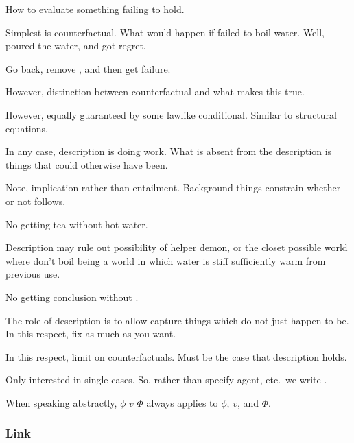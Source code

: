 \begin{note}
  How to evaluate something failing to hold.

  Simplest is counterfactual.
  What would happen if failed to boil water.
  Well, poured the water, and got regret.

  Go back, remove \ros{}, and then get failure.

  However, distinction between counterfactual and what makes this true.

  However, equally guaranteed by some lawlike conditional.
  Similar to structural equations.

  In any case, description is doing work.
  What is absent from the description is things that could otherwise have been.

  Note, implication rather than entailment.
  Background things constrain whether or not follows.

  No getting tea without hot water.

  Description may rule out possibility of helper demon, or the closet possible world where don't boil being a world in which water is stiff sufficiently warm from previous use.

  No getting conclusion without \ros{}.
\end{note}

\begin{note}
  The role of description is to allow capture things which do not just happen to be.
  In this respect, fix as much as you want.

  In this respect, limit on counterfactuals.
  Must be the case that description holds.
\end{note}

\begin{note}
  \begin{notation}
  \item
    Only interested in single cases.
    So, rather than specify agent, etc.\ we write \qWhyV{}.

    When speaking abstractly, \(\phi\) \(v\) \(\Phi\) \qWhyV{} always applies to \(\phi\), \(v\), and \(\Phi\).
  \end{notation}
\end{note}


\subsubsection{Link}
\label{cha:var:sec:vars:qwhyvnp:link}

